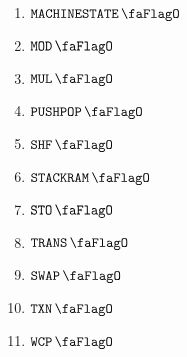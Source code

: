 \begin{description}
\begin{multicols}{3}
\begin{enumerate}
				\item $\machineStateFlag$
				\item $\modFlag$
				\item $\mulFlag$
				\item $\pushPopFlag$
				\item $\shfFlag$
				\item $\stackRamFlag$
				\item $\stoFlag$
				\item $\transFlag$
				\item $\swapFlag$
				\item $\txnFlag$
				\item $\wcpFlag$
			\end{enumerate}
		\end{multicols}
\end{description}
